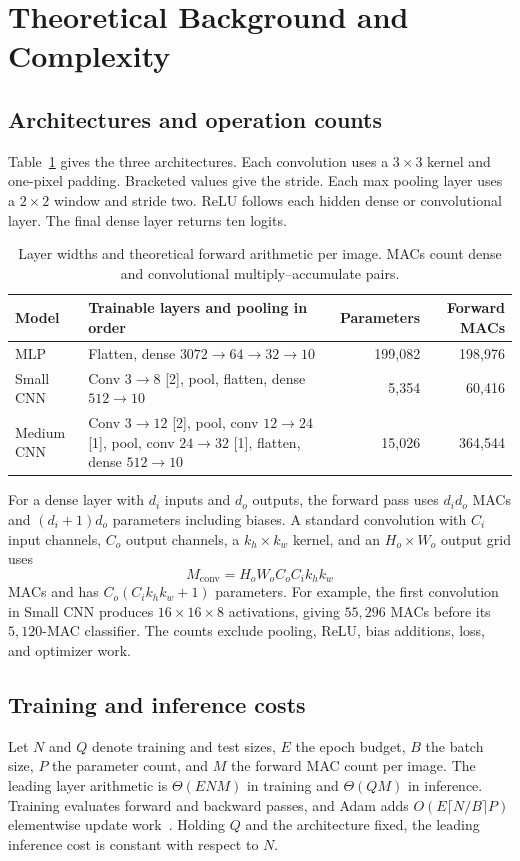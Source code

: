 \documentclass[conference]{IEEEtran}
\begin{document}
\section{Theoretical Background and Complexity}
\subsection{Architectures and operation counts}
Table~\ref{tab:architectures} gives the three architectures. Each convolution uses a $3\times3$ kernel and one-pixel padding. Bracketed values give the stride. Each max pooling layer uses a $2\times2$ window and stride two. ReLU follows each hidden dense or convolutional layer. The final dense layer returns ten logits.

\begin{table}[t]
\caption{Layer widths and theoretical forward arithmetic per image. MACs count dense and convolutional multiply--accumulate pairs.}
\label{tab:architectures}
\centering
\begin{tabular}{@{}llrr@{}}
\toprule
Model & Trainable layers and pooling in order & Parameters & Forward MACs \\
\midrule
MLP & Flatten, dense $3072\to64\to32\to10$ & 199,082 & 198,976 \\
Small CNN & Conv $3\to8$ [2], pool, flatten, dense $512\to10$ & 5,354 & 60,416 \\
Medium CNN & \shortstack[l]{Conv $3\to12$ [2], pool, conv $12\to24$ [1], pool,\\conv $24\to32$ [1], flatten, dense $512\to10$} & 15,026 & 364,544 \\
\bottomrule
\end{tabular}
\end{table}

For a dense layer with $d_i$ inputs and $d_o$ outputs, the forward pass uses $d_i d_o$ MACs and $(d_i+1)d_o$ parameters including biases. A standard convolution with $C_i$ input channels, $C_o$ output channels, a $k_h\times k_w$ kernel, and an $H_o\times W_o$ output grid uses
\begin{equation}
M_{\mathrm{conv}}=H_oW_o C_o C_i k_h k_w
\label{eq:conv}
\end{equation}
MACs and has $C_o(C_i k_h k_w+1)$ parameters. For example, the first convolution in Small CNN produces $16\times16\times8$ activations, giving $55{,}296$ MACs before its $5{,}120$-MAC classifier. The counts exclude pooling, ReLU, bias additions, loss, and optimizer work.

\subsection{Training and inference costs}
Let $N$ and $Q$ denote training and test sizes, $E$ the epoch budget, $B$ the batch size, $P$ the parameter count, and $M$ the forward MAC count per image. The leading layer arithmetic is $\Theta(ENM)$ in training and $\Theta(QM)$ in inference. Training evaluates forward and backward passes, and Adam adds $O(E\lceil N/B\rceil P)$ elementwise update work~\cite{adam}. Holding $Q$ and the architecture fixed, the leading inference cost is constant with respect to $N$.
\end{document}
